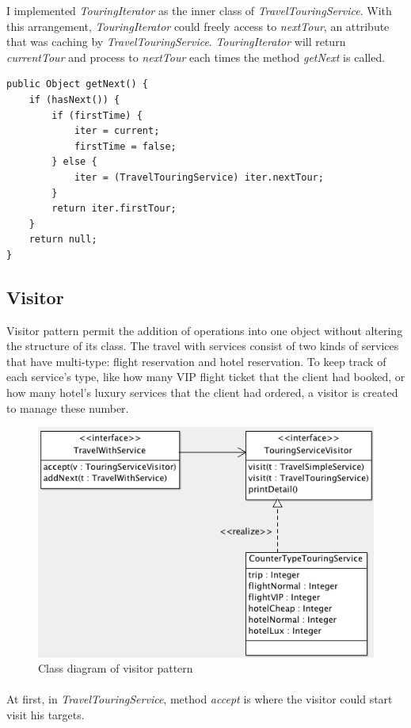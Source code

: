 I implemented \textit{TouringIterator} as the inner class of \textit{TravelTouringService}. With this arrangement, \textit{TouringIterator} could freely access to \textit{nextTour}, an attribute that was caching by \textit{TravelTouringService}. \textit{TouringIterator} will return \textit{currentTour} and process to \textit{nextTour} each times the method \textit{getNext} is called. 

\begin{lstlisting}
public Object getNext() {
	if (hasNext()) {
		if (firstTime) {
			iter = current;
			firstTime = false;
		} else {
			iter = (TravelTouringService) iter.nextTour;
		}
		return iter.firstTour;
	}
	return null;
}
\end{lstlisting}

\newpage
\subsection{Visitor}
Visitor pattern permit the addition of operations into one object without altering the structure of its class. The travel with services consist of two kinds of services that have multi-type: flight reservation and hotel reservation. To keep track of each service's type, like how many VIP flight ticket that the client had booked, or how many hotel's luxury services that the client had ordered, a visitor is created to  manage these number. 

\begin{figure}[h]
\centering
\includegraphics[width=12cm]{project/images/visitor.png}
\caption{Class diagram of visitor pattern}
\end{figure}

\paragraph{}
At first, in \textit{TravelTouringService}, method \textit{accept} is where the visitor could start visit his targets.

